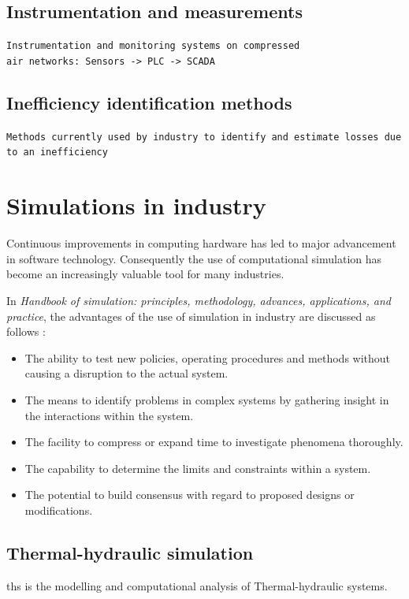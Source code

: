 	\subsection{Instrumentation and measurements}
	\texttt{Instrumentation and monitoring systems on compressed\\ air networks: Sensors -> PLC -> SCADA}
	\subsection{Inefficiency identification methods}
	\texttt{Methods currently used by industry to identify and estimate losses due to an inefficiency}
	
	
\section{Simulations in industry}

Continuous improvements in computing hardware has led to major advancement in software technology. Consequently the use of computational simulation has become an increasingly valuable tool for many industries.\cite{kocsis2003integration} \par 

 In \textit{ Handbook of simulation: principles, methodology, advances, applications, and practice}, the advantages of the use of simulation in industry are discussed as follows \cite{banks1998handbook}: 
\begin{itemize}
	\item The ability to test new policies, operating procedures and methods without causing a disruption to the actual system.
	\item The means to identify problems in complex systems by gathering insight in the interactions within the system.
	\item The facility to compress or expand time to investigate phenomena thoroughly.
	\item The capability to determine the limits and constraints within a system.
	\item The potential to build consensus with regard to proposed designs or modifications.
\end{itemize}

\subsection{Thermal-hydraulic simulation}
\gls{ths} is the modelling and computational analysis of Thermal-hydraulic systems.
